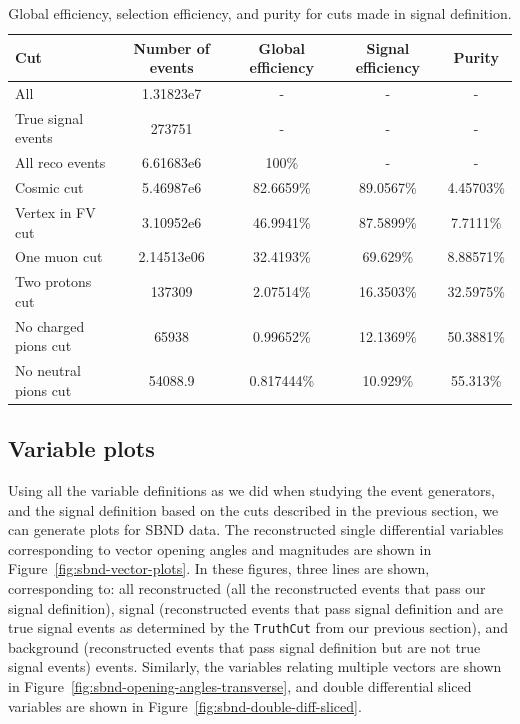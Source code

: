 \documentclass{article}
\begin{document}
\begin{table}
    \begin{center}
        \begin{tabular}{|l|cccc|}
        \hline
        \textbf{Cut}         & \textbf{Number of events} & \textbf{Global efficiency} & \textbf{Signal efficiency} & \textbf{Purity} \\ \hline
        All                  & 1.31823e7  & -       & -       & -      \\
        True signal events   & 273751 & -       & -       & -      \\
        All reco events      & 6.61683e6  & 100\%   & -       & -      \\
        Cosmic cut           & 5.46987e6  & 82.6659\% & 89.0567\% & 4.45703\% \\
        Vertex in FV cut     & 3.10952e6 & 46.9941\% & 87.5899\% & 7.7111\% \\
        One muon cut         & 2.14513e06 & 32.4193\% & 69.629\% & 8.88571\% \\
        Two protons cut      & 137309 & 2.07514\%  & 16.3503\% & 32.5975\% \\
        No charged pions cut & 65938 & 0.99652\%  & 12.1369\% & 50.3881\% \\
        No neutral pions cut & 54088.9 & 0.817444\%  & 10.929\% & 55.313\% \\ \hline
        \end{tabular}
    \end{center}
    \caption{Global efficiency, selection efficiency, and purity for cuts made in signal definition.}
    \label{table:cut-efficiency-purity}
\end{table}

\subsection{Variable plots}

Using all the variable definitions as we did when studying the event generators, and the signal definition based on the cuts described in the previous section, we can generate plots for SBND data. The reconstructed single differential variables corresponding to vector opening angles and magnitudes are shown in Figure~\ref{fig:sbnd-vector-plots}. In these figures, three lines are shown, corresponding to: all reconstructed (all the reconstructed events that pass our signal definition), signal (reconstructed events that pass signal definition and are true signal events as determined by the \verb|TruthCut| from our previous section), and background (reconstructed events that pass signal definition but are not true signal events) events. Similarly, the variables relating multiple vectors are shown in Figure~\ref{fig:sbnd-opening-angles-transverse}, and double differential sliced variables are shown in Figure~\ref{fig:sbnd-double-diff-sliced}.
\end{document}
